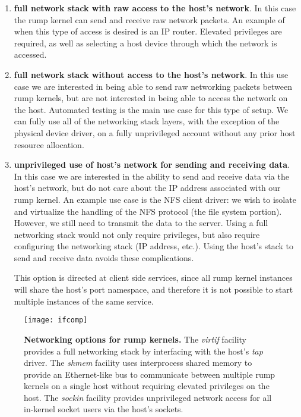\begin{enumerate}
\item   \textbf{full network stack with raw access to the host's
	network}.  In this case the rump kernel can send and receive
	raw network packets.  An example of when this type of access
	is desired is an IP router.  Elevated privileges are
	required, as well as selecting a host device through which
	the network is accessed.

\item   \textbf{full network stack without access to the host's
	network}.  In this use case we are interested in being able
	to send raw networking packets between rump kernels, but
	are not interested in being able to access the network on
	the host.  Automated testing is the main use case for this
	type of setup.  We can fully use all of the networking
	stack layers, with the exception of the physical device
	driver, on a fully unprivileged account without any prior
	host resource allocation.

\item   \textbf{unprivileged use of host's network for sending and
	receiving data}.  In this case we are interested in the
	ability to send and receive data via the host's network,
	but do not care about the IP address associated with our
	rump kernel.  An example use case is the NFS client driver:
	we wish to isolate and virtualize the handling of the NFS
	protocol (\ie the file system portion).  However, we still
	need to transmit the data to the server.  Using a full
	networking stack would not only require privileges, but
	also require configuring the networking stack (IP address,
	etc.).  Using the host's stack to send and receive data
	avoids these complications.

	This option is directed at client side services, since all
	rump kernel instances will share the host's port namespace,
	and therefore it is not possible to start multiple instances
	of the same service.
\end{enumerate}

\begin{figure}[t]
\texttt{[image: ifcomp]}
\caption[Networking options for rump kernels]{
\textbf{Networking options for rump kernels.}
The \textit{virtif}
facility provides a full networking stack by interfacing with the host's
\textit{tap} driver.  The \textit{shmem} facility uses interprocess
shared memory to provide an Ethernet-like bus to communicate between
multiple rump kernels on a single host without requiring elevated
privileges on the host.
The \textit{sockin} facility provides unprivileged network access for
all in-kernel socket users via the host's sockets.
}
\label{fig:netcomp}
\end{figure}

